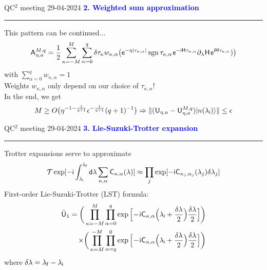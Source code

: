 \documentclass{beamer}
\def\lbt{\small QC$^2$ meeting 29-04-2024} %
\DeclareMathOperator{\sgn}{sgn}
\def\mt#1{\kern0.025em\mathsf{#1}\kern0.025em}
\def\d{\mathsf d}
\def\e{\mathsf e}
\def\i{\mathsf i}
\def\lambdai{{\lambda_{\sf i}}}
\def\lambdaf{{\lambda_{\sf f}}}
\def\>{\kern0.08em}
\newenvironment{dia}[2]
{
	\begin{frame}
	\vspace{1mm}
	{\small #1}
	\hfill
    {\small\bf\textcolor{blue}{#2}}
	\vspace{3mm}
	\hrule
	\bigskip
}
{
	\vfill
	\end{frame}
}
\begin{document}
\begin{dia}{\lbt}{2. Weighted sum approximation}
This pattern can be continued... \pause
\begin{align*}
    \mt A_{\eta, a}^{M, q} = \frac12 \sum_{\kappa = -M}^M \sum_{\alpha = 0}^q \delta\tau_\kappa w_{\kappa, \alpha} \big( \e^{-\eta|\tau_{\kappa, \alpha}|} \sgn\tau_{\kappa, \alpha} \> \e^{-\i \mt H \tau_{\kappa, \alpha}} \partial_\lambda \mt H \> \e^{\i \mt H \tau_{\kappa, \alpha}}) \big)
\end{align*} \pause
with $\sum_{\alpha = 0}^q w_{\kappa, \alpha} = 1$ \\[6mm] \pause
Weights $w_{\kappa, \alpha}$ only depend on our choice of $\tau_{\kappa, \alpha}$! \\[6mm] \pause
In the end, we get
\begin{align*}
    M \geq O\big( \eta^{-1 - \frac1{q + 1}} \epsilon^{-\frac1{q + 1}} (q + 1)^{-1} \big) \Rightarrow \|(\mt U_{\eta, a} - \mt U_{\eta, a}^{M, q})\ket{n(\lambdai)}\| \leq \epsilon
\end{align*}
\vspace{-0.8cm}
\end{dia}

\begin{dia}{\lbt}{3. Lie-Suzuki-Trotter expansion}
Trotter expansions serve to approximate
\begin{align*}
    \mathcal T \exp[-\i \int_\lambdai^\lambdaf \d\lambda \sum_{\kappa, \alpha} \mt C_{\kappa, \alpha}(\lambda)] 
    \approx \prod_j \exp[-\i \mt C_{\kappa_j, \alpha_j}(\lambda_j) \delta\lambda_j]
\end{align*} \pause
First-order Lie-Suzuki-Trotter (LST) formula:
\begin{align*}
    \tilde{\mt U}_1 = \bigg( \prod_{\kappa=-M}^M \prod_{\alpha = 0}^q \exp \Big[ \!-\!\i \mt C_{\kappa, \alpha} \Big( \lambdai + \frac{\delta\lambda}2 \Big) \frac{\delta\lambda}2 \Big] \bigg) \\\times \bigg( \prod_{\kappa=M}^{-M} \prod_{\alpha = q}^0 \exp \Big[ \!-\!\i \mt C_{\kappa, \alpha} \Big( \lambdai + \frac{\delta\lambda}2 \Big) \frac{\delta\lambda}2 \Big] \bigg)
\end{align*}
where $\delta\lambda = \lambdaf - \lambdai$
\end{dia}
\end{document}
